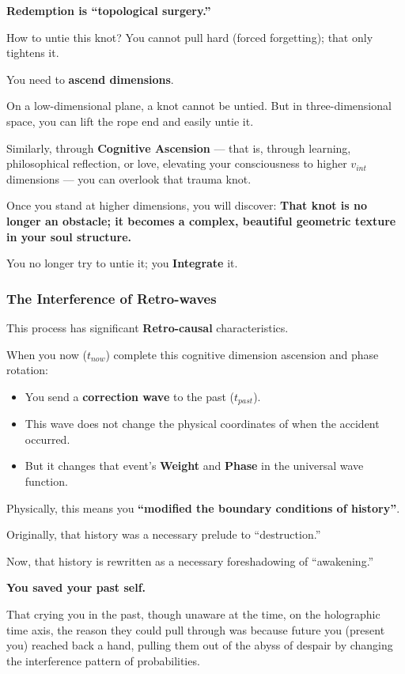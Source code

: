 \textbf{Redemption is ``topological surgery.''}

How to untie this knot? You cannot pull hard (forced forgetting); that only tightens it.

You need to \textbf{ascend dimensions}.

On a low-dimensional plane, a knot cannot be untied. But in three-dimensional space, you can lift the rope end and easily untie it.

Similarly, through \textbf{Cognitive Ascension} --- that is, through learning, philosophical reflection, or love, elevating your consciousness to higher $v_{int}$ dimensions --- you can overlook that trauma knot.

Once you stand at higher dimensions, you will discover: \textbf{That knot is no longer an obstacle; it becomes a complex, beautiful geometric texture in your soul structure.}

You no longer try to untie it; you \textbf{Integrate} it.

\subsubsection{The Interference of Retro-waves}

This process has significant \textbf{Retro-causal} characteristics.

When you now ($t_{now}$) complete this cognitive dimension ascension and phase rotation:

\begin{itemize}
\item You send a \textbf{correction wave} to the past ($t_{past}$).

\item This wave does not change the physical coordinates of when the accident occurred.

\item But it changes that event's \textbf{Weight} and \textbf{Phase} in the universal wave function.
\end{itemize}

Physically, this means you \textbf{``modified the boundary conditions of history''}.

Originally, that history was a necessary prelude to ``destruction.''

Now, that history is rewritten as a necessary foreshadowing of ``awakening.''

\textbf{You saved your past self.}

That crying you in the past, though unaware at the time, on the holographic time axis, the reason they could pull through was because future you (present you) reached back a hand, pulling them out of the abyss of despair by changing the interference pattern of probabilities.

